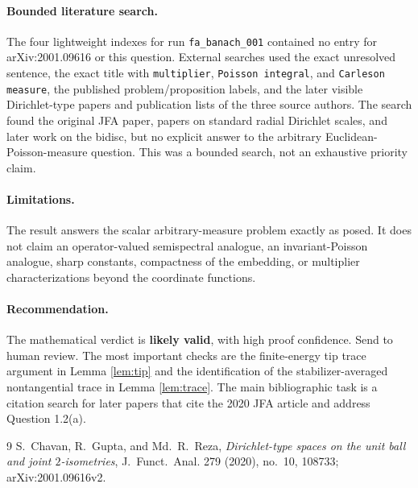 \documentclass[11pt]{article}
\theoremstyle{remark}
\begin{document}
\paragraph{Bounded literature search.}
The four lightweight indexes for run \texttt{fa\_banach\_001} contained no
entry for arXiv:2001.09616 or this question.  External searches used the exact
unresolved sentence, the exact title with \texttt{multiplier},
\texttt{Poisson integral}, and \texttt{Carleson measure}, the published
problem/proposition labels, and the later visible Dirichlet-type papers and
publication lists of the three source authors.  The search found the original
JFA paper, papers on standard radial Dirichlet scales, and later work on the
bidisc, but no explicit answer to the arbitrary Euclidean-Poisson-measure
question.  This was a bounded search, not an exhaustive priority claim.

\paragraph{Limitations.}
The result answers the scalar arbitrary-measure problem exactly as posed.  It
does not claim an operator-valued semispectral analogue, an invariant-Poisson
analogue, sharp constants, compactness of the embedding, or multiplier
characterizations beyond the coordinate functions.

\paragraph{Recommendation.}
The mathematical verdict is \textbf{likely valid}, with high proof confidence.
Send to human review.  The most important checks are the finite-energy tip
trace argument in Lemma \ref{lem:tip} and the identification of the
stabilizer-averaged nontangential trace in Lemma \ref{lem:trace}.  The main
bibliographic task is a citation search for later papers that cite the 2020
JFA article and address Question 1.2(a).

\begin{thebibliography}{9}
S.~Chavan, R.~Gupta, and Md.~R.~Reza,
\emph{Dirichlet-type spaces on the unit ball and joint $2$-isometries},
J.~Funct.~Anal. 279 (2020), no.~10, 108733; arXiv:2001.09616v2.
\end{thebibliography}
\endgroup
\end{document}
